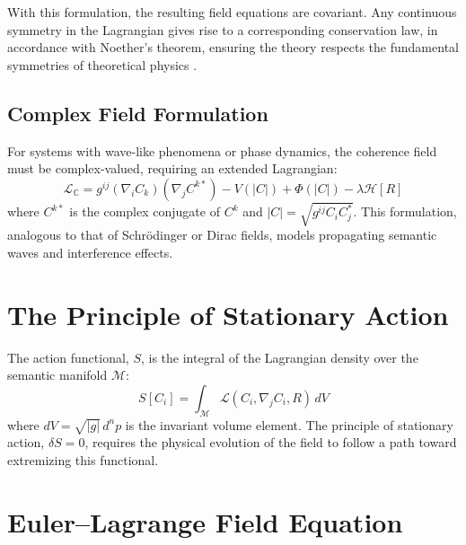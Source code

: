 With this formulation, the resulting field equations are covariant. Any continuous symmetry in the Lagrangian gives rise to a corresponding conservation law, in accordance with Noether's theorem, ensuring the theory respects the fundamental symmetries of theoretical physics \autocite{Noether1918, Lagrange1788, Euler1744, LandauLifshitz1975, PeskinSchroeder1995, Weinberg1995}.

\subsection{Complex Field Formulation}
For systems with wave-like phenomena or phase dynamics, the coherence field must be complex-valued, requiring an extended Lagrangian:
\begin{equation}
\mathcal{L}_{\mathbb{C}} = g^{ij} (\nabla_i C_k)(\nabla_j C^{k*}) - V(|C|) + \Phi(|C|) - \lambda \mathcal{H}[R]
\end{equation}
where \(C^{k*}\) is the complex conjugate of \(C^k\) and \(|C| = \sqrt{g^{ij} C_i C_j^*}\). This formulation, analogous to that of Schrödinger or Dirac fields, models propagating semantic waves and interference effects.

\section{The Principle of Stationary Action}

The action functional, \(S\), is the integral of the Lagrangian density over the semantic manifold \(\mathcal{M}\):
\begin{equation}
S[C_i] = \int_{\mathcal{M}} \mathcal{L}(C_i, \nabla_j C_i, R) \, dV
\end{equation}
where \(dV = \sqrt{|g|} \, d^n p\) is the invariant volume element. The principle of stationary action, \(\delta S = 0\), requires the physical evolution of the field to follow a path toward extremizing this functional.

\section{Euler–Lagrange Field Equation}

